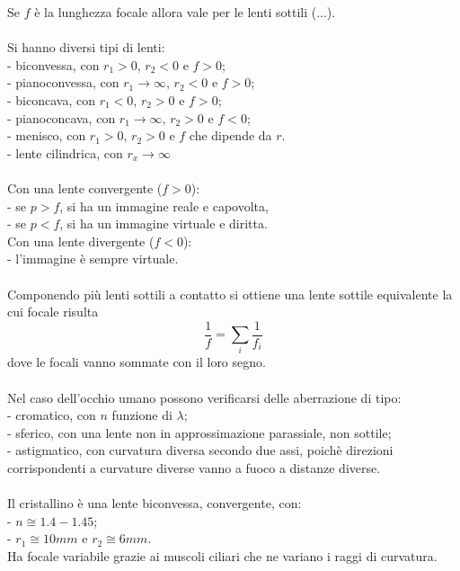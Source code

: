 \documentclass{article}
\begin{document}
Se $f$ è la lunghezza focale allora vale per le lenti sottili (...).\\
\\
Si hanno diversi tipi di lenti:\\
- biconvessa, con $r_1>0$, $r_2<0$ e $f>0$;\\
- pianoconvessa, con $r_1 \rightarrow \infty$, $r_2<0$ e $f>0$;\\
- biconcava, con $r_1<0$, $r_2>0$ e $f>0$;\\
- pianoconcava, con $r_1\rightarrow \infty$, $r_2>0$ e $f<0$;\\
- menisco, con $r_1>0$, $r_2>0$ e $f$ che dipende da $r$.\\
- lente cilindrica, con $r_x\rightarrow\infty$\\
\\
Con una lente convergente ($f > 0$):\\
- se $p > f$, si ha un immagine reale e capovolta,\\
- se $p < f$, si ha un immagine virtuale e diritta.\\
Con una lente divergente ($f < 0$):\\
- l’immagine è sempre virtuale.\\
\\
Componendo più lenti sottili a contatto si ottiene una lente sottile equivalente la cui focale risulta
\begin{equation}
    \frac{1}{f}=\sum_i\frac{1}{f_i}
    \nonumber
\end{equation}
dove le focali vanno sommate con il loro segno.\\
\\
Nel caso dell'occhio umano possono verificarsi delle aberrazione di tipo:\\
- cromatico, con $n$ funzione di $\lambda$;\\
- sferico, con una lente non in approssimazione parassiale, non sottile;\\
- astigmatico, con curvatura diversa secondo due assi, poichè direzioni corrispondenti a curvature diverse vanno a fuoco a distanze diverse.\\
\\
Il cristallino è una lente biconvessa, convergente, con: \\
- $n \cong 1.4-1.45$;\\
- $r_1 \cong 10mm$ e $r_2 \cong 6mm$.\\
Ha focale variabile grazie ai muscoli ciliari che ne
variano i raggi di curvatura.\\
\end{document}
